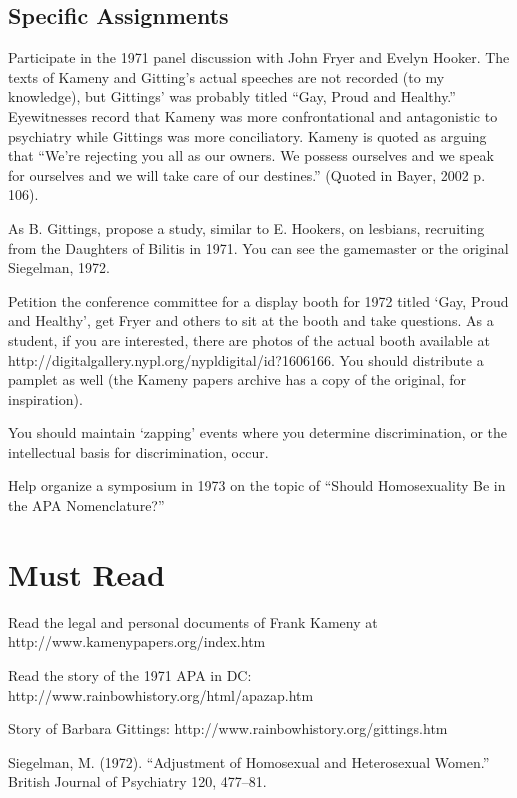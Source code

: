 \begin{refsection}
\subsection{Specific Assignments}
\label{specificassignments}

Participate in the 1971 panel discussion with John Fryer and Evelyn Hooker. The texts of Kameny and Gitting's actual speeches are not recorded (to my knowledge), but Gittings' was probably titled ``Gay, Proud and Healthy.'' Eyewitnesses record that Kameny was more confrontational and antagonistic to psychiatry while Gittings was more conciliatory. Kameny is quoted as arguing that ``We're rejecting you all as our owners. We possess ourselves and we speak for ourselves and we will take care of our destines.'' (Quoted in Bayer, 2002 p. 106).

As B. Gittings, propose a study, similar to E. Hookers, on lesbians, recruiting from the Daughters of Bilitis in 1971. You can see the gamemaster or the original Siegelman, 1972.

Petition the conference committee for a display booth for 1972 titled `Gay, Proud and Healthy', get Fryer and others to sit at the booth and take questions. As a student, if you are interested, there are photos of the actual booth available at http:\slash \slash digitalgallery.nypl.org\slash nypldigital\slash id?1606166. You should distribute a pamplet as well (the Kameny papers archive has a copy of the original, for inspiration).

You should maintain `zapping' events where you determine discrimination, or the intellectual basis for discrimination, occur.

Help organize a symposium in 1973 on the topic of ``Should Homosexuality Be in the APA Nomenclature?''

\section{Must Read}
\label{mustread}

Read the legal and personal documents of Frank Kameny at http:\slash \slash www.kamenypapers.org\slash index.htm

Read the story of the 1971 APA in DC: http:\slash \slash www.rainbowhistory.org\slash html\slash apazap.htm

Story of Barbara Gittings: http:\slash \slash www.rainbowhistory.org\slash gittings.htm

Siegelman, M. (1972). ``Adjustment of Homosexual and Heterosexual Women.'' British Journal of Psychiatry 120, 477--81.


\end{refsection}
